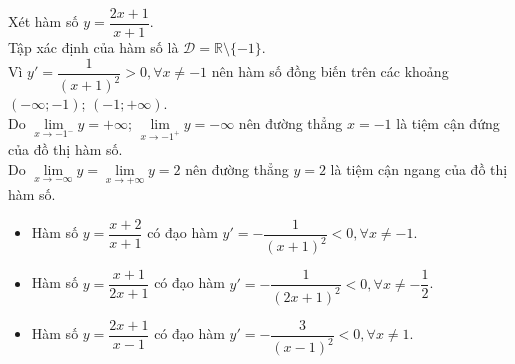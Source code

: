 \begin{ex}%
  {
  }
 \loigiai
  {
  Xét hàm số $y = \dfrac{2x+1}{x+1}$.\\
  Tập xác định của hàm số là $\mathscr{D} = \mathbb{R} \setminus \{-1\}$.\\
  Vì $y' = \dfrac{1}{(x+1)^2} >0, \forall x \neq -1$ nên hàm số đồng biến trên các khoảng $(-\infty; -1)$; $(-1; +\infty)$.\\
  Do $\lim\limits_{x \to -1^-} y = +\infty$; $\lim\limits_{x \to -1^+} y = - \infty$ nên đường thẳng $x = -1$ là tiệm cận đứng của đồ thị hàm số.\\
  Do $\lim\limits_{x \to -\infty} y = \lim\limits_{x \to +\infty} y = 2$ nên đường thẳng $y = 2$ là tiệm cận ngang của đồ thị hàm số.
  \begin{itemize}
   \item Hàm số $y=\dfrac{x+2}{x+1}$ có đạo hàm $y'=-\dfrac{1}{(x+1)^2}<0,\forall x \neq -1$.
   \item Hàm số $y=\dfrac{x+1}{2x+1}$ có đạo hàm $y'=-\dfrac{1}{(2x+1)^2}<0,\forall x \neq -\dfrac{1}{2}$.
   \item Hàm số $y=\dfrac{2x+1}{x-1}$ có đạo hàm $y'=-\dfrac{3}{(x-1)^2}<0,\forall x \neq 1$.
  \end{itemize}
  }
\end{ex}


